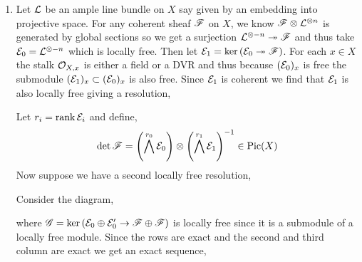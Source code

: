 \documentclass[12pt]{article}
\begin{document}
\begin{enumerate}
\item Let $\mathcal{L}$ be an ample line bundle on $X$ say given by an embedding into projective space. For any coherent sheaf $\mathscr{F}$ on $X$, we know $\mathscr{F} \otimes \mathcal{L}^{\otimes n}$ is generated by global sections so we get a surjection $\mathcal{L}^{\otimes -n} \twoheadrightarrow \mathscr{F}$ and thus take $\mathcal{E}_0 = \mathcal{L}^{\otimes -n}$ which is locally free. Then let $\mathcal{E}_1 = \ker{(\mathcal{E}_0 \twoheadrightarrow\mathscr{F})}$. For each $x \in X$ the stalk $\mathcal{O}_{X, x}$ is either a field or a DVR and thus because $(\mathcal{E}_0)_x$ is free the submodule $(\mathcal{E}_1)_x \subset (\mathcal{E}_0)_x$ is also free. Since $\mathcal{E}_1$ is coherent we find that $\mathcal{E}_1$ is also locally free giving a resolution,
\begin{center}
\end{center}
Let $r_i = \operatorname{\mathrm{rank}}{\mathcal{E}_i}$ and define,
\[ \det{\mathscr{F}} = \left( \bigwedge^{r_0} \mathcal{E}_0 \right) \otimes \left( \bigwedge^{r_1} \mathcal{E}_1 \right)^{-1} \in \mathrm{Pic}(X) \]
Now suppose we have a second locally free resolution,
\begin{center}
\end{center}
Consider the diagram,
\begin{center}
\end{center}
where $\mathscr{G} = \ker{(\mathcal{E}_0 \oplus \mathcal{E}_0' \to \mathscr{F}\oplus \mathscr{F})}$ is locally free since it is a submodule of a locally free module. Since the rows are exact and the second and third column are exact we get an exact sequence,
\begin{center}

\end{center}
\end{enumerate}
\end{document}
